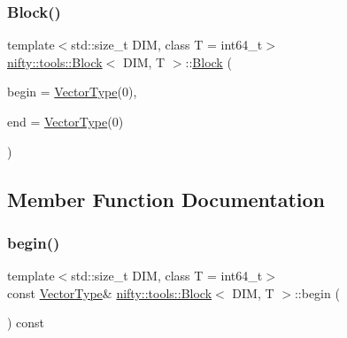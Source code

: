\subsubsection{\texorpdfstring{Block()}{Block()}}
{\footnotesize\ttfamily template$<$std\+::size\+\_\+t D\+IM, class T  = int64\+\_\+t$>$ \\
\hyperlink{classnifty_1_1tools_1_1Block}{nifty\+::tools\+::\+Block}$<$ D\+IM, T $>$\+::\hyperlink{classnifty_1_1tools_1_1Block}{Block} (\begin{DoxyParamCaption}\item[{const \hyperlink{classnifty_1_1tools_1_1Block_aa077b4ebbf3e4e9b679d1957ca10ba32}{Vector\+Type} \&}]{begin = {\ttfamily \hyperlink{classnifty_1_1tools_1_1Block_aa077b4ebbf3e4e9b679d1957ca10ba32}{Vector\+Type}(0)},  }\item[{const \hyperlink{classnifty_1_1tools_1_1Block_aa077b4ebbf3e4e9b679d1957ca10ba32}{Vector\+Type} \&}]{end = {\ttfamily \hyperlink{classnifty_1_1tools_1_1Block_aa077b4ebbf3e4e9b679d1957ca10ba32}{Vector\+Type}(0)} }\end{DoxyParamCaption})\hspace{0.3cm}{\ttfamily [inline]}}



\subsection{Member Function Documentation}
\mbox{\label{classnifty_1_1tools_1_1Block_ac7e8b2af42afe467226831c9c68301e9}} 
\subsubsection{\texorpdfstring{begin()}{begin()}}
{\footnotesize\ttfamily template$<$std\+::size\+\_\+t D\+IM, class T  = int64\+\_\+t$>$ \\
const \hyperlink{classnifty_1_1tools_1_1Block_aa077b4ebbf3e4e9b679d1957ca10ba32}{Vector\+Type}\& \hyperlink{classnifty_1_1tools_1_1Block}{nifty\+::tools\+::\+Block}$<$ D\+IM, T $>$\+::begin (\begin{DoxyParamCaption}{ }\end{DoxyParamCaption}) const\hspace{0.3cm}{\ttfamily [inline]}}

\mbox{\label{classnifty_1_1tools_1_1Block_a60b2b16eb9dadb0878e7b025e2840e06}} 
